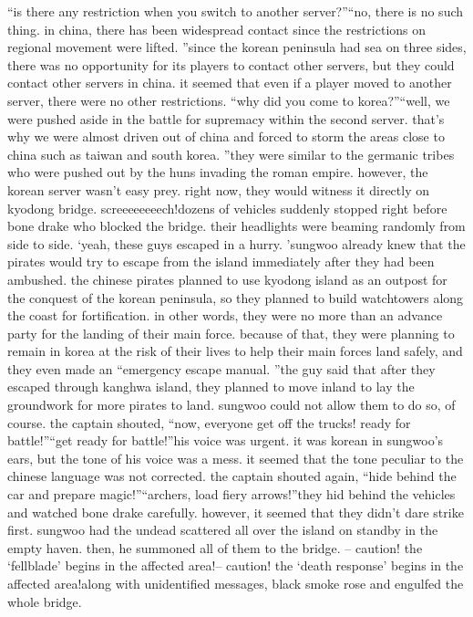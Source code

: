 “is there any restriction when you switch to another server?”“no, there is no such thing.
 in china, there has been widespread contact since the restrictions on regional movement were lifted.
”since the korean peninsula had sea on three sides, there was no opportunity for its players to contact other servers, but they could contact other servers in china.
it seemed that even if a player moved to another server, there were no other restrictions.
“why did you come to korea?”“well, we were pushed aside in the battle for supremacy within the second server.
 that’s why we were almost driven out of china and forced to storm the areas close to china such as taiwan and south korea.
”they were similar to the germanic tribes who were pushed out by the huns invading the roman empire.
 however, the korean server wasn’t easy prey.
right now, they would witness it directly on kyodong bridge.
screeeeeeeech!dozens of vehicles suddenly stopped right before bone drake who blocked the bridge.
their headlights were beaming randomly from side to side.
‘yeah, these guys escaped in a hurry.
’sungwoo already knew that the pirates would try to escape from the island immediately after they had been ambushed.
the chinese pirates planned to use kyodong island as an outpost for the conquest of the korean peninsula, so they planned to build watchtowers along the coast for fortification.
in other words, they were no more than an advance party for the landing of their main force.
because of that, they were planning to remain in korea at the risk of their lives to help their main forces land safely, and they even made an “emergency escape manual.
”the guy said that after they escaped through kanghwa island, they planned to move inland to lay the groundwork for more pirates to land.
sungwoo could not allow them to do so, of course.
the captain shouted, “now, everyone get off the trucks! ready for battle!”“get ready for battle!”his voice was urgent.
 it was korean in sungwoo’s ears, but the tone of his voice was a mess.
 it seemed that the tone peculiar to the chinese language was not corrected.
the captain shouted again, “hide behind the car and prepare magic!”“archers, load fiery arrows!”they hid behind the vehicles and watched bone drake carefully.
 however, it seemed that they didn’t dare strike first.
sungwoo had the undead scattered all over the island on standby in the empty haven.
 then, he summoned all of them to the bridge.
– caution! the ‘fellblade’ begins in the affected area!– caution! the ‘death response’ begins in the affected area!along with unidentified messages, black smoke rose and engulfed the whole bridge.
